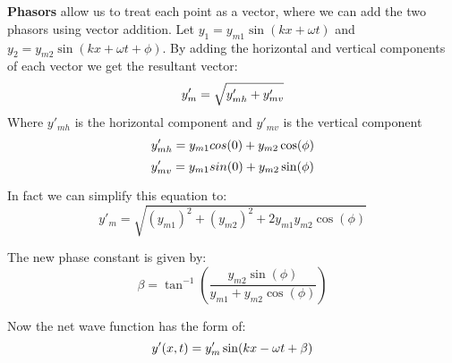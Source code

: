 \documentclass[11pt]{article}
\begin{document}
    \hfill
   \noindent \\ \\ \textbf{Phasors} allow us to treat each point as a vector, where we can
    add the two phasors using vector addition.
    Let $y_1 = y_{m1} \sin(kx + \omega t)$ and $y_2 = y_{m2} \sin(kx + \omega t + \phi)$.
    By adding the horizontal and vertical components of each vector we get the resultant vector:
    \begin{equation}
        y'_{m} = \sqrt{y'_{mh} +y'_{mv}} \notag
    \end{equation}
    Where  $y'_{mh}$ is the horizontal component and $y'_{mv}$ is the vertical component
    \begin{equation}
        y'_{mh} = y_{m1}cos(0) + y_{m2}\cos(\phi) \notag
    \end{equation}
    \begin{equation}
        y'_{mv} = y_{m1}sin(0) + y_{m2}\sin(\phi) \notag
    \end{equation}

    \noindent In fact we can simplify this equation to:
    \begin{equation}
        y'_{m} = \sqrt{(y_{m1})^2 + (y_{m2})^2 + 2y_{m1}y_{m2}\cos(\phi)} \tag{net amplitude}
    \end{equation}
    
    \noindent The new phase constant is given by:
    \begin{equation}
        \beta = \tan^{-1}({\frac{y_{m2}\sin(\phi)}{y_{m1} + y_{m2} \cos(\phi)}}) \tag{net phase constant}
    \end{equation}

    \noindent Now the net wave function has the form of:
    \begin{equation}
        y'(x,t) =  y'_{m}\sin(kx - \omega t + \beta) \notag
    \end{equation}
\end{document}
